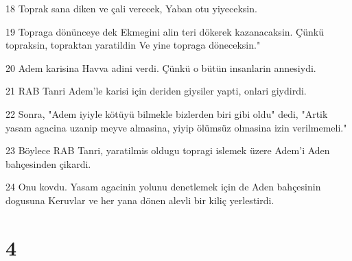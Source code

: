 \par 18 Toprak sana diken ve çali verecek, Yaban otu yiyeceksin.
\par 19 Topraga dönünceye dek Ekmegini alin teri dökerek kazanacaksin. Çünkü topraksin, topraktan yaratildin Ve yine topraga döneceksin."
\par 20 Adem karisina Havva adini verdi. Çünkü o bütün insanlarin annesiydi.
\par 21 RAB Tanri Adem'le karisi için deriden giysiler yapti, onlari giydirdi.
\par 22 Sonra, "Adem iyiyle kötüyü bilmekle bizlerden biri gibi oldu" dedi, "Artik yasam agacina uzanip meyve almasina, yiyip ölümsüz olmasina izin verilmemeli."
\par 23 Böylece RAB Tanri, yaratilmis oldugu topragi islemek üzere Adem'i Aden bahçesinden çikardi.
\par 24 Onu kovdu. Yasam agacinin yolunu denetlemek için de Aden bahçesinin dogusuna Keruvlar ve her yana dönen alevli bir kiliç yerlestirdi.

\chapter{4}

